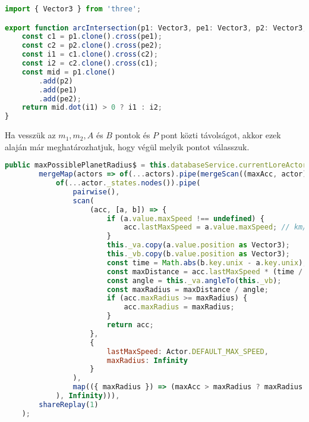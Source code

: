 \begin{lstlisting}[language={JavaScript}]
import { Vector3 } from 'three';

export function arcIntersection(p1: Vector3, pe1: Vector3, p2: Vector3, pe2: Vector3): Vector3 {
	const c1 = p1.clone().cross(pe1);
	const c2 = p2.clone().cross(pe2);
	const i1 = c1.clone().cross(c2);
	const i2 = c2.clone().cross(c1);
	const mid = p1.clone()
		.add(p2)
		.add(pe1)
		.add(pe2);
	return mid.dot(i1) > 0 ? i1 : i2;
}
\end{lstlisting}

Ha vesszük az $m_1, m_2, A$ és $B$ pontok és $P$ pont közti távolságot, akkor ezek alaján már meghatározhatjuk, hogy végül melyik pontot válasszuk.




















\begin{lstlisting}[language={JavaScript}]
	public maxPossiblePlanetRadius$ = this.databaseService.currentLoreActors$.pipe(
		mergeMap(actors => of(...actors).pipe(mergeScan((maxAcc, actor) =>
			of(...actor._states.nodes()).pipe(
				pairwise(),
				scan(
					(acc, [a, b]) => {
						if (a.value.maxSpeed !== undefined) {
							acc.lastMaxSpeed = a.value.maxSpeed; // km/h
						}
						this._va.copy(a.value.position as Vector3);
						this._vb.copy(b.value.position as Vector3);
						const time = Math.abs(b.key.unix - a.key.unix); // s
						const maxDistance = acc.lastMaxSpeed * (time / 3600);
						const angle = this._va.angleTo(this._vb);
						const maxRadius = maxDistance / angle;
						if (acc.maxRadius >= maxRadius) {
							acc.maxRadius = maxRadius;
						}
						return acc;
					},
					{
						lastMaxSpeed: Actor.DEFAULT_MAX_SPEED,
						maxRadius: Infinity
					}
				),
				map(({ maxRadius }) => (maxAcc > maxRadius ? maxRadius : maxAcc))
			), Infinity))),
		shareReplay(1)
	);

\end{lstlisting}






























